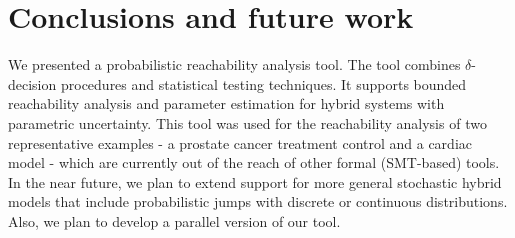 \section{Conclusions and future work}
\vspace{-.4cm}
We presented a probabilistic reachability analysis tool. The tool combines $\delta$-decision 
procedures \cite{gao2013dreal, gao2013satisfiability, gaodelta} and statistical testing techniques. 
It supports bounded reachability analysis and parameter estimation for hybrid systems with parametric 
uncertainty. This tool was used for the reachability analysis of two representative examples - a prostate 
cancer treatment control and a cardiac model - which are currently out of the reach of other formal
(SMT-based) tools. In the near future, we plan to extend support for more general stochastic hybrid models 
that include probabilistic jumps with discrete or continuous distributions. Also, we plan to develop
a parallel version of our tool.

